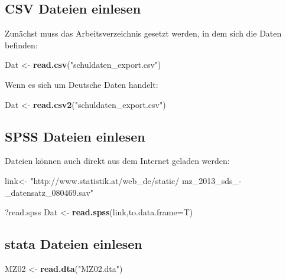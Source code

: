 \documentclass[]{article}
\newenvironment{Shaded}{\begin{snugshade}}{\end{snugshade}}
\newcommand{\KeywordTok}[1]{\textcolor[rgb]{0.13,0.29,0.53}{\textbf{{#1}}}}
\newcommand{\DataTypeTok}[1]{\textcolor[rgb]{0.13,0.29,0.53}{{#1}}}
\newcommand{\StringTok}[1]{\textcolor[rgb]{0.31,0.60,0.02}{{#1}}}
\newcommand{\NormalTok}[1]{{#1}}
\begin{document}
\subsection{CSV Dateien einlesen}\label{csv-dateien-einlesen}

Zunächst muss das Arbeitsverzeichnis gesetzt werden, in dem sich die
Daten befinden:

\begin{Shaded}
\begin{Highlighting}[]
\NormalTok{Dat <-}\StringTok{ }\KeywordTok{read.csv}\NormalTok{(}\StringTok{"schuldaten_export.csv"}\NormalTok{)}
\end{Highlighting}
\end{Shaded}

Wenn es sich um Deutsche Daten handelt:

\begin{Shaded}
\begin{Highlighting}[]
\NormalTok{Dat <-}\StringTok{ }\KeywordTok{read.csv2}\NormalTok{(}\StringTok{"schuldaten_export.csv"}\NormalTok{)}
\end{Highlighting}
\end{Shaded}

\subsection{SPSS Dateien einlesen}\label{spss-dateien-einlesen}

Dateien können auch direkt aus dem Internet geladen werden:

\begin{Shaded}
\begin{Highlighting}[]
\NormalTok{link<-}\StringTok{ "http://www.statistik.at/web_de/static/}
\StringTok{mz_2013_sds_-_datensatz_080469.sav"}

\NormalTok{?read.spss}
\NormalTok{Dat <-}\StringTok{ }\KeywordTok{read.spss}\NormalTok{(link,}\DataTypeTok{to.data.frame=}\NormalTok{T)}
\end{Highlighting}
\end{Shaded}

\subsection{stata Dateien einlesen}\label{stata-dateien-einlesen}

\begin{Shaded}
\begin{Highlighting}[]
\NormalTok{MZ02 <-}\StringTok{ }\KeywordTok{read.dta}\NormalTok{(}\StringTok{"MZ02.dta"}\NormalTok{)}
\end{Highlighting}
\end{Shaded}
\end{document}
